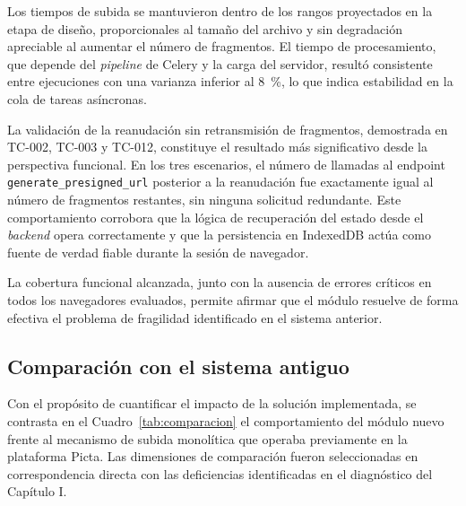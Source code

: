 Los tiempos de subida se mantuvieron dentro de los rangos proyectados en la etapa de diseño,
proporcionales al tamaño del archivo y sin degradación apreciable al aumentar el número de
fragmentos. El tiempo de procesamiento, que depende del \textit{pipeline} de Celery y la carga del
servidor, resultó consistente entre ejecuciones con una varianza inferior al 8~\%, lo que indica
estabilidad en la cola de tareas asíncronas.

La validación de la reanudación sin retransmisión de fragmentos, demostrada en TC-002, TC-003 y
TC-012, constituye el resultado más significativo desde la perspectiva funcional. En los tres
escenarios, el número de llamadas al endpoint \texttt{generate\_presigned\_url} posterior a la
reanudación fue exactamente igual al número de fragmentos restantes, sin ninguna solicitud
redundante. Este comportamiento corrobora que la lógica de recuperación del estado desde el
\textit{backend} opera correctamente y que la persistencia en IndexedDB actúa como fuente de verdad
fiable durante la sesión de navegador.

La cobertura funcional alcanzada, junto con la ausencia de errores críticos en todos los navegadores
evaluados, permite afirmar que el módulo resuelve de forma efectiva el problema de fragilidad
identificado en el sistema anterior.

\subsection{Comparación con el sistema antiguo}
\label{subsec:comparacion}

Con el propósito de cuantificar el impacto de la solución implementada, se contrasta en el
Cuadro~\ref{tab:comparacion} el comportamiento del módulo nuevo frente al mecanismo de subida
monolítica que operaba previamente en la plataforma Picta. Las dimensiones de comparación fueron
seleccionadas en correspondencia directa con las deficiencias identificadas en el diagnóstico del
Capítulo I.

